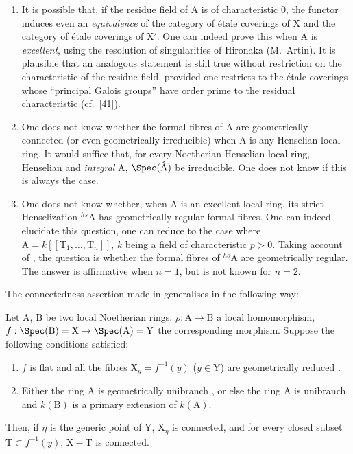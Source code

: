 \begin{remarks}[18.9.6]
\label{IV.18.9.6}
\begin{enumerate}[label=\emph{\roman*)}]
  \item It is possible that, if the residue field of A is of characteristic 0, the functor  induces even an \emph{equivalence} of the category of \'{e}tale coverings of X and the category of \'{e}tale coverings of $\mathrm{X}'$.
  One can indeed prove this when A is \emph{excellent}, using the resolution of singularities of Hironaka (M.~Artin).
  It is plausible that an analogous statement is still true without restriction on the characteristic of the residue field, provided one restricts to the \'{e}tale coverings whose ``principal Galois groups'' have order prime to the residual characteristic (cf.~[41]).

  \item One does not know whether the formal fibres of A are geometrically connected (or even geometrically irreducible) when A is any Henselian local ring.
  It would suffice that, for every Noetherian Henselian local ring, Henselian and \emph{integral} A, $\Spec(\hat{\mathrm{A}})$ be irreducible.
  One does not know if this is always the case.

  \item One does not know whether, when A is an excellent local ring, its strict Henselization ${}^{hs}\!\mathrm{A}$ has geometrically regular formal fibres.
  One can indeed elucidate this question, one can reduce to the case where $\mathrm{A}=k[[\mathrm{T}_1,\ldots,\mathrm{T}_n]]$, $k$ being a field of characteristic $p>0$.
  Taking account of , the question is whether the formal fibres of ${}^{hs}\!\mathrm{A}$ are geometrically regular.
  The answer is affirmative when $n=1$, but is not known for $n=2$.
\end{enumerate}
\end{remarks}

The connectedness assertion made in  generalises in the following way:

\begin{theorem}[18.9.7]
\label{IV.18.9.7}
Let $\mathrm{A}$, $\mathrm{B}$ be two local Noetherian rings, $\rho:\mathrm{A}\to\mathrm{B}$ a local homomorphism, $f:\Spec(\mathrm{B})=\mathrm{X}\to\Spec(\mathrm{A})=\mathrm{Y}$ the corresponding morphism.
Suppose the following conditions satisfied:
\begin{enumerate}[label=\emph{\roman*)}]
  \item $f$ is flat and all the fibres $\mathrm{X}_y=f^{-1}(y)$ ($y\in\mathrm{Y}$) are geometrically reduced .
  \item Either the ring $\mathrm{A}$ is geometrically unibranch , or else the ring A is unibranch  and $k(\mathrm{B})$ is a primary extension  of $k(\mathrm{A})$.
\end{enumerate}
Then, if $\eta$ is the generic point of $\mathrm{Y}$, $\mathrm{X}_\eta$ is connected, and for every closed subset $\mathrm{T}\subset f^{-1}(y)$, $\mathrm{X}-\mathrm{T}$ is connected.
\end{theorem}


